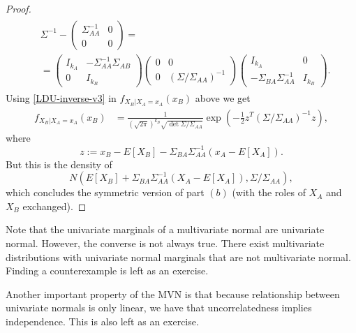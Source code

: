 \documentclass{book}
\theoremstyle{plain}%
\theoremstyle{definition}
\begin{document}
\begin{proof}
\begin{align}
        \label{LDU-inverse-v3}
        \begin{split}
        &\Sigma^{-1}
            -
            \begin{pmatrix}
                \Sigma_{AA}^{-1} & 0 \\ 0 & 0
            \end{pmatrix}
        =\\
        &=
                \begin{pmatrix}
            I_{k_A} & -\Sigma_{AA}^{-1}\Sigma_{AB}\\
            0 & I_{k_B}
        \end{pmatrix}
        \begin{pmatrix}
            0 & 0\\
            0 & (\Sigma/\Sigma_{AA})^{-1}
        \end{pmatrix}
        \begin{pmatrix}
            I_{k_A} & 0\\
            -\Sigma_{BA}\Sigma_{AA}^{-1} & I_{k_B}
        \end{pmatrix}.
        \end{split}
        \end{align}
        Using \eqref{LDU-inverse-v3} in $f_{X_B|X_A=x_A}(x_B)$
        above we get
        \begin{align*}
            f_{X_B|X_A=x_A}(x_B)
            &=
            \frac
            {1}
            {(\sqrt{2\pi})^{k_B} \sqrt{\det \Sigma/\Sigma_{AA}}}
            \exp\left(
            -\frac{1}{2}
            z^T
            (\Sigma/\Sigma_{AA})^{-1}
            z
            \right),
        \end{align*}
        where
        $$z:=x_B-E[X_B]-\Sigma_{BA}\Sigma_{AA}^{-1}(x_A-E[X_A]).$$
        But this is the density of 
        $$N(E[X_B]+\Sigma_{BA}\Sigma_{AA}^{-1}(X_A-E[X_A])
        ,\Sigma/\Sigma_{AA}),$$
        which concludes the symmetric version of part $(b)$ (with 
        the roles of $X_A$ and $X_B$ exchanged).
    \end{proof}

Note that the univariate marginals of a multivariate normal are univariate normal. However, the converse is not always true. There exist multivariate distributions with univariate normal marginals that are not multivariate normal. Finding a counterexample is left as an exercise.

Another important property of the MVN is that because relationship between univariate normals is only linear, we have that uncorrelatedness implies independence. This is also left as an exercise.
\end{document}
